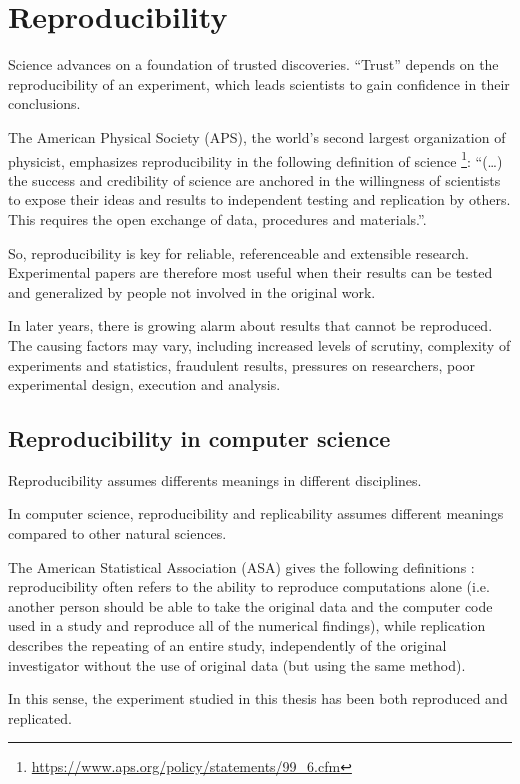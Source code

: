 \newpage
\chapter{Reproducibility}

Science advances on a foundation of trusted discoveries. ``Trust'' depends on the reproducibility of an experiment, which leads scientists to gain confidence in their conclusions. 

The American Physical Society (APS), the world's second largest organization of physicist, emphasizes reproducibility in the following definition of science \footnote{\url{https://www.aps.org/policy/statements/99_6.cfm}}: ``(\dots) the success and credibility of science are anchored in the willingness of scientists to expose their ideas and results to independent testing and replication by others. This requires the open exchange of data, procedures and materials.''.

So, reproducibility is key for reliable, referenceable and extensible research. Experimental papers are therefore most useful when their results can be tested and generalized by people not involved in the original work.

In later years, there is growing alarm about results that cannot be reproduced. The causing factors may vary, including increased levels of scrutiny, complexity of experiments and statistics, fraudulent results, pressures on researchers, poor experimental design, execution and analysis.

\section{Reproducibility in computer science}

Reproducibility assumes differents meanings in different disciplines.

In computer science, reproducibility and replicability assumes different meanings compared to other natural sciences.

The American Statistical Association (ASA) gives the following definitions \cite{asa}: reproducibility often refers to the ability to reproduce computations alone (i.e. another person should be able to take the original data and the computer code used in a study and reproduce all of the numerical findings), while replication describes the repeating of an entire study, independently of the original investigator without the use of original data (but using the same method).

In this sense, the experiment studied in this thesis has been both reproduced and replicated.

